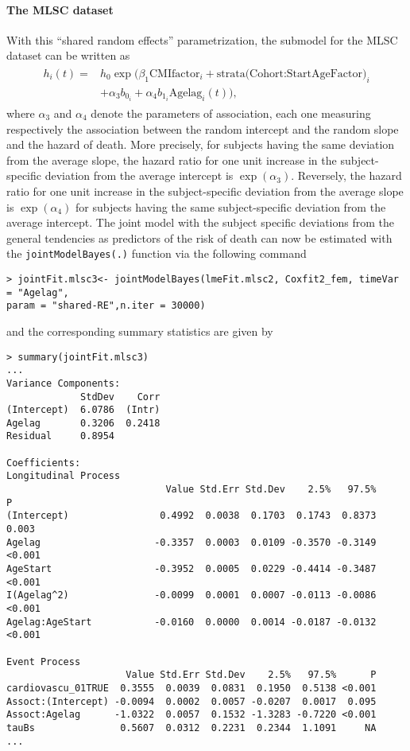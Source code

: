 \documentclass[12pt]{article}
\begin{document}
\paragraph{The MLSC dataset}
With this ``shared random effects'' parametrization, the submodel for the MLSC dataset can be written as
\begin{equation}
\begin{split}
\begin{aligned}
h_i(t) = &h_0 \exp \big(\beta_1 \text{CMIfactor}_i+ \text{strata(Cohort:StartAgeFactor)}_i \\
&+ \alpha_3 b_{0_i} + \alpha_4 b_{1_{i}} \text{Agelag}_i(t) \big),
\end{aligned}
\end{split}
\label{Survival model_mlsc3}
\end{equation}
where $\alpha_3$ and $\alpha_4$ denote the parameters of association, each one measuring respectively the association between the random intercept and the random slope and the hazard of death. More precisely, for subjects having the same deviation from the average slope, the hazard ratio for one unit increase in the subject-specific deviation from the average intercept is $\exp (\alpha_3)$. Reversely, the hazard ratio for one unit increase in the subject-specific deviation from the average slope is $\exp (\alpha_4)$ for subjects having the same subject-specific deviation from the average intercept.
The joint model with the subject specific deviations from the general tendencies as predictors of the risk of death can now be estimated with the \texttt{jointModelBayes(.)} function via the following command
\begin{verbatim}
> jointFit.mlsc3<- jointModelBayes(lmeFit.mlsc2, Coxfit2_fem, timeVar = "Agelag",
param = "shared-RE",n.iter = 30000)
\end{verbatim}
and the corresponding summary statistics are given by
\begin{verbatim}
> summary(jointFit.mlsc3)
...
Variance Components:
             StdDev    Corr
(Intercept)  6.0786  (Intr)
Agelag       0.3206  0.2418
Residual     0.8954

Coefficients:
Longitudinal Process
                            Value Std.Err Std.Dev    2.5%   97.5%      P
(Intercept)                0.4992  0.0038  0.1703  0.1743  0.8373  0.003
Agelag                    -0.3357  0.0003  0.0109 -0.3570 -0.3149 <0.001
AgeStart                  -0.3952  0.0005  0.0229 -0.4414 -0.3487 <0.001
I(Agelag^2)               -0.0099  0.0001  0.0007 -0.0113 -0.0086 <0.001
Agelag:AgeStart           -0.0160  0.0000  0.0014 -0.0187 -0.0132 <0.001

Event Process
                     Value Std.Err Std.Dev    2.5%   97.5%      P
cardiovascu_01TRUE  0.3555  0.0039  0.0831  0.1950  0.5138 <0.001
Assoct:(Intercept) -0.0094  0.0002  0.0057 -0.0207  0.0017  0.095
Assoct:Agelag      -1.0322  0.0057  0.1532 -1.3283 -0.7220 <0.001
tauBs               0.5607  0.0312  0.2231  0.2344  1.1091     NA
...
\end{verbatim}
\end{document}
